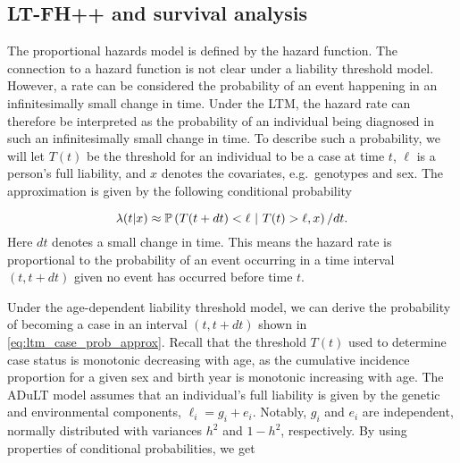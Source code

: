 
\subsection{LT-FH++ and survival analysis}
The proportional hazards model is defined by the hazard function. The connection to a hazard function is not clear under a liability threshold model. However, a rate can be considered the probability of an event happening in an infinitesimally small change in time. Under the LTM, the hazard rate can therefore be interpreted as the probability of an individual being diagnosed in such an infinitesimally small change in time\cite{kragh2021analysis}. To describe such a probability, we will let $ T(t) $ be the threshold for an individual to be a case at time $ t $, $ \ell $ is a person's full liability, and $ x $ denotes the covariates, e.g.\ genotypes and sex. The approximation is given by the following conditional probability

\begin{equation}\label{eq:ltm_case_prob_approx}
	\lambda(t|x) \approx 
	\mathbb{P}\left(T(t + dt) < \ell ~|~ T(t) > \ell, x \right) / dt.
\end{equation}
Here $ dt $ denotes a small change in time. This means the hazard rate is proportional to the probability of an event occurring in a time interval $ (t, t + dt) $ given no event has occurred before time $ t $.

%
Under the age-dependent liability threshold model, we can derive the probability of becoming a case in an interval $ (t, t+ dt) $ shown in \cref{eq:ltm_case_prob_approx}. Recall that the threshold $ T(t) $ used to determine case status is monotonic decreasing with age, as the cumulative incidence proportion for a given sex and birth year is monotonic increasing with age. The ADuLT model assumes that an individual's full liability is given by the genetic and environmental components, $ \ell_i = g_i + e_i $. Notably, $ g_i $ and $ e_i $ are independent, normally distributed with variances $ h^2 $ and $ 1 - h^2 $, respectively. By using properties of conditional probabilities, we get


